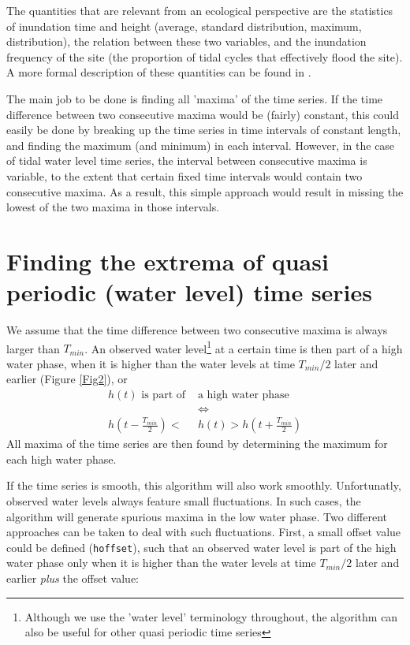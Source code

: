 \documentclass[10pt,a4wide]{article}
\begin{document}
The quantities that are relevant from an ecological perspective are the statistics of inundation time and height (average, standard distribution, maximum, distribution), the relation between these two variables, and the inundation frequency of the site (the proportion of tidal cycles that effectively flood the site). A more formal description of these quantities can be found in \citep{Cox2006}.

The main job to be done is finding all 'maxima' of the time series. If the time difference between two consecutive maxima would be (fairly) constant, this could easily be done by breaking up the time series in time intervals of constant length, and finding the maximum (and minimum) in each interval. However, in the case of tidal water level time series, the interval between consecutive maxima is variable, to the extent that certain fixed time intervals would contain two consecutive maxima. As a result, this simple approach would result in missing the lowest of the two maxima in those intervals. 

\section{Finding the extrema of quasi periodic (water level) time series}
We assume that the time difference between two consecutive maxima is always larger than $T_{min}$. An observed water level\footnote{Although we use the 'water level' terminology throughout, the algorithm can also be useful for other quasi periodic time series} at a certain time is then part of a high water phase, when it is higher than the water levels at time $T_{min}/2$ later and earlier (Figure \ref{Fig2}), or
\begin{align}
h(t) \textrm{ is part of } 	& \textrm{a high water phase} \nonumber\\
\nonumber 			&\Leftrightarrow \\\nonumber
h(t-\frac{T_{min}}{2}) < 	&h(t) > h(t+\frac{T_{min}}{2}) 
\end{align}
All maxima of the time series are then found by determining the maximum for each high water phase.

If the time series is smooth, this algorithm will also work smoothly. Unfortunatly, observed water levels always feature small fluctuations. In such cases, the algorithm will generate spurious maxima in the low water phase. Two different approaches can be taken to deal with such fluctuations. First,  a small offset value could be defined (\texttt{hoffset}), such that an observed water level is part of the high water phase only when it is higher than the water levels at time $T_{min}/2$ later and earlier \emph{plus} the offset value: 
\end{document}

